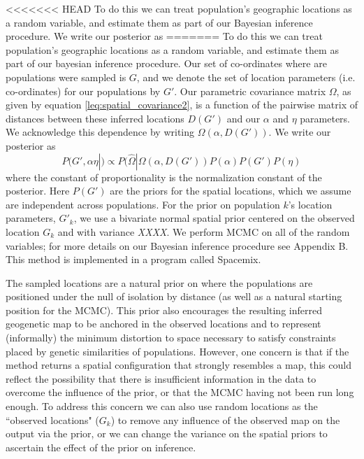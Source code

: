 \documentclass[12pt]{article}
\newcommand{\gc}[1]{{\em \color{blue} #1}}
\begin{document}
<<<<<<< HEAD
To do this we can treat population's geographic locations as a random variable, and estimate them as part of our Bayesian inference procedure.  We write our posterior as 
=======
To do this we can treat population's geographic locations as a random variable, and estimate them as part of our bayesian inference procedure. Our set of co-ordinates where are populations were sampled is $G$, and we denote the set of location parameters (i.e. co-ordinates) for our populations by $G'$. Our parametric covariance matrix $\Omega$, as given by equation \eqref{leq:spatial_covariance2}, is a function of the pairwise matrix of distances between these inferred locations $D(G')$ and our $\alpha$ and $\eta$ parameters. We acknowledge this dependence by writing $\Omega(\alpha,{D}(G'))$.  We write our posterior as 
\begin{equation}
P(G', \alpha \eta| ) \propto  P(\widehat{\Omega} |\Omega(\alpha,{D}(G') ) P(\alpha) P(G') P(\eta) 
\end{equation}
where the constant of proportionality is the normalization constant of the posterior. Here $P(G') $ are the priors for the spatial locations, which we assume are independent across populations. For the prior on population $k$'s location parameters, $G'_k$, we use a bivariate normal spatial prior centered on the observed location $G_k$ and with variance \gc{XXXX}. We perform MCMC on all of the random variables; for more details on our Bayesian inference procedure see Appendix B. This method is implemented in a program called Spacemix.


The sampled locations are a natural prior on where the populations are positioned under the null of isolation by distance (as well as a natural starting position for the MCMC). This prior also encourages the resulting inferred geogenetic map to be anchored in the observed locations and to represent (informally) the minimum distortion to space necessary to satisfy constraints placed by genetic similarities of populations. However, one concern is that if the method returns a spatial configuration that strongly resembles a map, this could reflect the possibility that there is insufficient information in the data to overcome the influence of the prior, or that the MCMC having not been run long enough.  To address this concern we can also use random locations as the ``observed locations" ($G_k$) to remove any influence of the observed map on the output via the prior, or we can change the variance on the spatial priors to ascertain the effect of the prior on inference.
\end{document}

